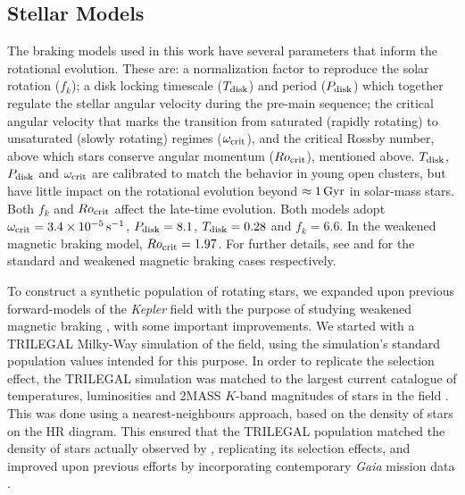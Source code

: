 \subsection{Stellar Models}\label{ssec:models}
The braking models used in this work have several parameters that inform the rotational evolution. These are: a normalization factor to reproduce the solar rotation ($f_k$); a disk locking timescale ($T_{\rm disk}$) and period ($P_{\rm disk}$) which together regulate the stellar angular velocity during the pre-main sequence; the critical angular velocity that marks the transition from saturated (rapidly rotating) to unsaturated (slowly rotating) regimes ($\omega_{\rm crit}$), and the critical Rossby number, above which stars conserve angular momentum ($Ro_{\rm crit}$), mentioned above. $T_{\rm disk}$, $P_{\rm disk}$ and $\omega_{\rm crit}$ are calibrated to match the behavior in young open clusters, but have little impact on the rotational evolution beyond $\approx 1\, \rm{Gyr}$ in solar-mass stars. Both $f_k$ and $Ro_{\rm crit}$ affect the late-time evolution. Both models adopt $\omega_{\rm crit} = 3.4  \times 10^{-5}\, \rm{s}^{-1}$, $P_{\rm disk} = 8.1$, $T_{\rm disk} = 0.28$ and $f_k = 6.6$. In the weakened magnetic braking model, $Ro_{\rm crit} = 1.97$.  For further details, see \cite{vansaders+pinsonneault2013} and \cite{vansaders+2016, m_vansaders+2019} for the standard and weakened magnetic braking cases respectively.

To construct a synthetic population of rotating stars, we expanded upon previous forward-models of the \textit{Kepler} field with the purpose of studying weakened magnetic braking \cite{vansaders+2019}, with some important improvements. We started with a TRILEGAL \cite{girardi+2012} Milky-Way simulation of the \kepler field, using the simulation's standard population values intended for this purpose. In order to replicate the \kepler selection effect, the TRILEGAL simulation was matched to the largest current catalogue of temperatures, luminosities and 2MASS $K$-band magnitudes of stars in the \kepler field \cite{berger+2020}. This was done using a nearest-neighbours approach, based on the density of stars on the HR diagram. This ensured that the TRILEGAL population matched the density of stars actually observed by \kepler, replicating its selection effects, and improved upon previous efforts \cite{vansaders+2019} by incorporating contemporary \textit{Gaia} mission data \cite{gaiacollaboration+2018}.

